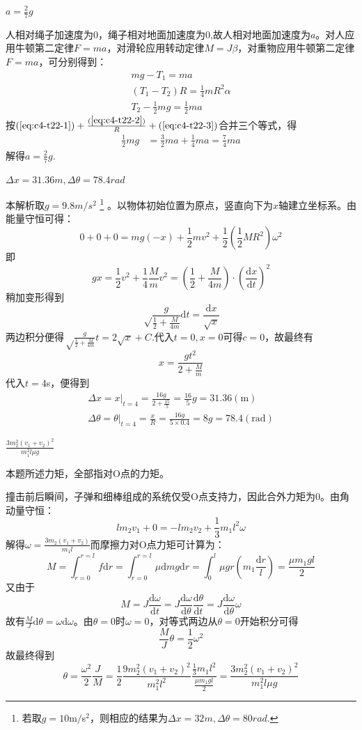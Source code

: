 \documentclass[b5paper,opensource,sourcefont,parskip]{qyxf-book}
\newcommand{\di}[1]{\mathrm{d}#1}
\newcommand{\dy}[2]{\frac{\di{#1}}{\di{#2}}}
\begin{document}
$a=\frac{2}{7}g$

\solve 人相对绳子加速度为0，绳子相对地面加速度为0,故人相对地面加速度为$a$。对人应用牛顿第二定律$F=ma$，对滑轮应用转动定律$M=J\beta$，对重物应用牛顿第二定律$F=ma$，可分别得到：
\begin{gather}
mg-T_1=ma\label{eq:c4-t22-1}\\
(T_1-T_2)R=\frac{1}{4}mR^2\alpha\label{eq:c4-t22-2}\\
T_2-\frac{1}{2}mg=\frac{1}{2}ma\label{eq:c4-t22-3}
\end{gather}
按$(\ref{eq:c4-t22-1})+\frac{(\ref{eq:c4-t22-2})}{R}+(\ref{eq:c4-t22-3})$合并三个等式，得
\begin{align*}
\frac{1}{2}mg&=\frac{3}{2}ma+\frac{1}{4}ma=\frac{7}{4}ma
\end{align*}
解得$a=\frac{2}{7}g.$

$\Delta x=31.36m,\Delta\theta=78.4rad$

\solve 本解析取$ g=9.8m/s^2 $
\footnote{若取$g=10$m$/$s${}^2$，则相应的结果为$\Delta x=32m,\Delta\theta=80rad.$}
。以物体初始位置为原点，竖直向下为$x$轴建立坐标系。由能量守恒可得：
\[0+0+0=mg(-x)+\frac{1}{2}mv^2+\frac{1}{2}\left(\frac{1}{2}MR^2\right)\omega^2\]
即
\[gx=\frac{1}{2}v^2+\frac{1}{4}\frac{M}{m}v^2=\left(\dfrac12+\frac{M}{4m}\right)\cdot\left(\dy{x}{t}\right)^2\]
稍加变形得到
\[\sqrt\frac{g}{\frac{1}{2}+\frac{M}{4m}}\di{t}=\frac{\di{x}}{\sqrt{x}}\]
两边积分便得$\sqrt\frac{g}{\frac{1}{2}+\frac{M}{4m}}t=2\sqrt{x}+C$.代入$ t=0,x=0$可得$c=0$，故最终有
\[x=\frac{gt^2}{2+\frac{M}{m}}\]
代入$t=4$s，便得到
\begin{gather*}
\Delta x=x\left.\right|_{t=4}=\frac{16g}{2+\frac{15}{5}}=\frac{16}{5}g=31.36(\mathrm{m})\\
\Delta\theta=\left.\theta\right|_{t=4}=\frac{x}{R}=\frac{16g}{5\times 0.4}=8g=78.4(\mathrm{rad})
\end{gather*}

$\frac{3m_2^2(v_1+v_2)^2}{m_1^2l\mu g}$

\solve 本题所述力矩，全部指对O点的力矩。

撞击前后瞬间，子弹和细棒组成的系统仅受O点支持力，因此合外力矩为0。由角动量守恒：
\[lm_2v_1+0=-lm_2v_2+\frac{1}{3}m_1l^2\omega\]
解得$\omega=\frac{3m_2(v_1+v_2)}{m_1l}$而摩擦力对O点力矩可计算为：
\[M=\int_{r=0}^{r=l}f\di{r}=\int_{r=0}^{r=l}\mu \di{m}g\di{r}=\int_0^l\mu gr\left(m_1\frac{\di{r}}{l}\right)=\frac{\mu m_1gl}{2}\]
又由于
\[M=J\dy{\omega}{t}=J\dy{\omega}{\theta}\dy{\theta}{t}=J\dy{\omega}{\theta}\omega\]
故有$\frac{M}{J}\di{\theta}=\omega\di{\omega}$。由$\theta=0$时$\omega=0$，对等式两边从$\theta=0$开始积分可得
\[\frac{M}{J}\theta=\frac{1}{2}\omega^2\]
故最终得到
\[\theta=\frac{\omega^2}{2}\frac{J}{M}=\frac{1}{2}\frac{9m_2^2(v_1+v_2)^2}{m_1^2l^2}\frac{\frac{1}{3}m_1l^2}{\frac{\mu m_1gl}{2}}=\frac{3m_2^2(v_1+v_2)^2}{m_1^2l\mu g}\]
\end{document}
